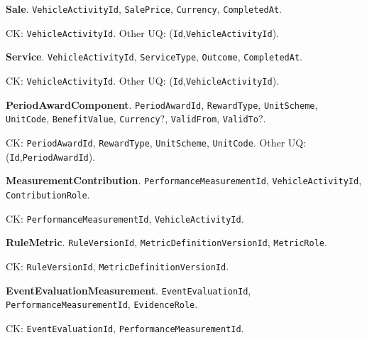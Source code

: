 \par\vspace{2.0pt}\noindent\textbf{Sale}. \texttt{Vehicle\allowbreak{}Activity\allowbreak{}Id}, \texttt{Sale\allowbreak{}Price}, \texttt{Currency}, \texttt{Completed\allowbreak{}At}.\par\noindent CK: \texttt{Vehicle\allowbreak{}Activity\allowbreak{}Id}. Other UQ: (\texttt{Id},\texttt{Vehicle\allowbreak{}Activity\allowbreak{}Id}).
\par\vspace{2.0pt}\noindent\textbf{Service}. \texttt{Vehicle\allowbreak{}Activity\allowbreak{}Id}, \texttt{Service\allowbreak{}Type}, \texttt{Outcome}, \texttt{Completed\allowbreak{}At}.\par\noindent CK: \texttt{Vehicle\allowbreak{}Activity\allowbreak{}Id}. Other UQ: (\texttt{Id},\texttt{Vehicle\allowbreak{}Activity\allowbreak{}Id}).
\par\vspace{2.0pt}\noindent\textbf{PeriodAwardComponent}. \texttt{Period\allowbreak{}Award\allowbreak{}Id}, \texttt{Reward\allowbreak{}Type}, \texttt{Unit\allowbreak{}Scheme}, \texttt{Unit\allowbreak{}Code}, \texttt{Benefit\allowbreak{}Value}, \texttt{Currency}?, \texttt{Valid\allowbreak{}From}, \texttt{Valid\allowbreak{}To}?.\par\noindent CK: \texttt{Period\allowbreak{}Award\allowbreak{}Id}, \texttt{Reward\allowbreak{}Type}, \texttt{Unit\allowbreak{}Scheme}, \texttt{Unit\allowbreak{}Code}. Other UQ: (\texttt{Id},\texttt{Period\allowbreak{}Award\allowbreak{}Id}).
\par\vspace{2.0pt}\noindent\textbf{MeasurementContribution}. \texttt{Performance\allowbreak{}Measurement\allowbreak{}Id}, \texttt{Vehicle\allowbreak{}Activity\allowbreak{}Id}, \texttt{Contribution\allowbreak{}Role}.\par\noindent CK: \texttt{Performance\allowbreak{}Measurement\allowbreak{}Id}, \texttt{Vehicle\allowbreak{}Activity\allowbreak{}Id}.
\par\vspace{2.0pt}\noindent\textbf{RuleMetric}. \texttt{Rule\allowbreak{}Version\allowbreak{}Id}, \texttt{Metric\allowbreak{}Definition\allowbreak{}Version\allowbreak{}Id}, \texttt{Metric\allowbreak{}Role}.\par\noindent CK: \texttt{Rule\allowbreak{}Version\allowbreak{}Id}, \texttt{Metric\allowbreak{}Definition\allowbreak{}Version\allowbreak{}Id}.
\par\vspace{2.0pt}\noindent\textbf{EventEvaluationMeasurement}. \texttt{Event\allowbreak{}Evaluation\allowbreak{}Id}, \texttt{Performance\allowbreak{}Measurement\allowbreak{}Id}, \texttt{Evidence\allowbreak{}Role}.\par\noindent CK: \texttt{Event\allowbreak{}Evaluation\allowbreak{}Id}, \texttt{Performance\allowbreak{}Measurement\allowbreak{}Id}.
